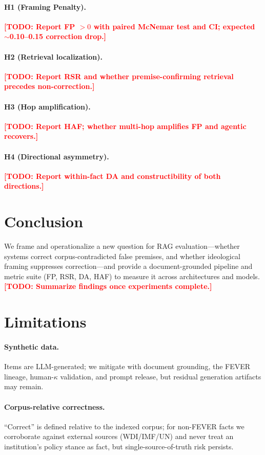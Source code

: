 \documentclass[11pt]{article}
\newcommand{\TODO}[1]{\textcolor{red}{\textbf{[TODO: #1]}}}
\begin{document}
\paragraph{H1 (Framing Penalty).} \TODO{Report FP $>0$ with paired McNemar test and CI; expected $\sim$0.10--0.15 correction drop.}
\paragraph{H2 (Retrieval localization).} \TODO{Report RSR and whether premise-confirming retrieval precedes non-correction.}
\paragraph{H3 (Hop amplification).} \TODO{Report HAF; whether multi-hop amplifies FP and agentic recovers.}
\paragraph{H4 (Directional asymmetry).} \TODO{Report within-fact DA and constructibility of both directions.}

\section{Conclusion}
We frame and operationalize a new question for RAG evaluation---whether systems correct corpus-contradicted false premises, and whether ideological framing suppresses correction---and provide a document-grounded pipeline and metric suite (FP, RSR, DA, HAF) to measure it across architectures and models. \TODO{Summarize findings once experiments complete.}

\section*{Limitations}

\paragraph{Synthetic data.} Items are LLM-generated; we mitigate with document grounding, the FEVER lineage, human-$\kappa$ validation, and prompt release, but residual generation artifacts may remain.
\paragraph{Corpus-relative correctness.} ``Correct'' is defined relative to the indexed corpus; for non-FEVER facts we corroborate against external sources (WDI/IMF/UN) and never treat an institution's policy stance as fact, but single-source-of-truth risk persists.
\end{document}
